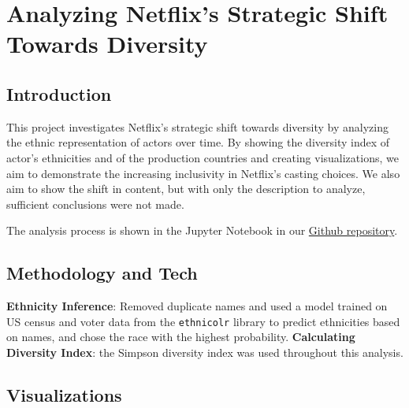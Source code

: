 \documentclass{article}
\begin{document}
\section*{Analyzing Netflix's Strategic Shift Towards Diversity}

\subsection*{Introduction}

This project investigates Netflix's strategic shift towards diversity by analyzing the ethnic representation of actors over time. By showing the diversity index of actor's ethnicities and of the production countries and creating visualizations, we aim to demonstrate the increasing inclusivity in Netflix's casting choices. We also aim to show the shift in content, but with only the description to analyze, sufficient conclusions were not made.

\noindent The analysis process is shown in the Jupyter Notebook in our \href{https://github.com/cparthiv/RHS-TSA-Data-Science-Qualifier-2024}{Github repository}.

\subsection*{Methodology and Tech}

\noindent\textbf{Ethnicity Inference}: Removed duplicate names and used a model trained on US census and voter data from the \texttt{ethnicolr} library to predict ethnicities based on names, and chose the race with the highest probability. \newline
\noindent\textbf{Calculating Diversity Index}: the Simpson diversity index was used throughout this analysis.




\subsection*{Visualizations}
\end{document}
